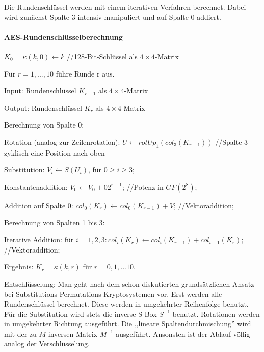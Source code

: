 \documentclass[a4paper]{article}
\begin{document}
\begin{multicols}{3}
    Die Rundenschlüssel werden mit einem iterativen Verfahren berechnet. Dabei wird zunächst Spalte 3 intensiv manipuliert und auf Spalte 0 addiert.

    \paragraph{AES-Rundenschlüsselberechnung}
    $K_0 =\kappa (k,0)\leftarrow k$ //128-Bit-Schlüssel als $4\times 4$-Matrix

    Für $r= 1,..., 10$ führe Runde r aus.
    \begin{itemize*}
        \item Input: Rundenschlüssel $K_{r-1}$ als $4\times 4$-Matrix
        \item Output: Rundenschlüssel $K_r$ als $4\times 4$-Matrix
        \item Berechnung von Spalte 0:
        \begin{enumerate*}
            \item Rotation (analog zur Zeilenrotation): $U\leftarrow rotUp_1(col_3(K_{r-1}))$ //Spalte 3 zyklisch eine Position nach oben
            \item  Substitution: $V_i\leftarrow S(U_i)$, für $0\geq i\geq 3$;
            \item  Konstantenaddition: $V_0\leftarrow V_0+02^{r-1}$; //Potenz in $GF(2^8)$;
            \item Addition auf Spalte 0: $col_0(K_r)\leftarrow col_0(K_{r-1})+V$; //Vektoraddition;
        \end{enumerate*}
        \item Berechnung von Spalten 1 bis 3:
        \item Iterative Addition: für $i=1,2,3: col_i(K_r)\leftarrow col_i(K_{r-1})+col_{i-1}(K_r)$; //Vektoraddition;
        \item Ergebnis: $K_r=\kappa (k,r)$ für $r=0,1,...10$.
    \end{itemize*}

    Entschlüsselung:
    Man geht nach dem schon diskutierten grundsätzlichen Ansatz bei Substitutions-Permutations-Kryptosystemen vor. Erst werden alle Rundenschlüssel berechnet. Diese werden in umgekehrter Reihenfolge benutzt. Für die Substitution wird stets die inverse S-Box $S^{-1}$ benutzt. Rotationen werden in umgekehrter Richtung ausgeführt. Die ,,lineare Spaltendurchmischung'' wird mit der zu $M$ inversen Matrix $M^{-1}$ ausgeführt. Ansonsten ist der Ablauf völlig analog der Verschlüsselung.


\end{multicols}
\end{document}
